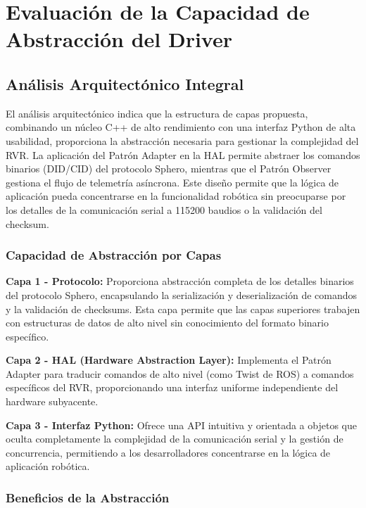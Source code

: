 \documentclass[11pt]{article}
\numberwithin{figure}{section}
\numberwithin{table}{section}
\begin{document}
\newpage


\section{Evaluación de la Capacidad de Abstracción del Driver}
\label{sec:evaluacion_abstraccion}


\subsection{Análisis Arquitectónico Integral}

El análisis arquitectónico indica que la estructura de capas propuesta, combinando un núcleo C++ de alto rendimiento con una interfaz Python de alta usabilidad, proporciona la abstracción necesaria para gestionar la complejidad del RVR. La aplicación del Patrón Adapter en la HAL permite abstraer los comandos binarios (DID/CID) del protocolo Sphero, mientras que el Patrón Observer gestiona el flujo de telemetría asíncrona. Este diseño permite que la lógica de aplicación pueda concentrarse en la funcionalidad robótica sin preocuparse por los detalles de la comunicación serial a 115200 baudios o la validación del checksum.


\subsubsection{Capacidad de Abstracción por Capas}

\textbf{Capa 1 - Protocolo:} Proporciona abstracción completa de los detalles binarios del protocolo Sphero, encapsulando la serialización y deserialización de comandos y la validación de checksums. Esta capa permite que las capas superiores trabajen con estructuras de datos de alto nivel sin conocimiento del formato binario específico.

\textbf{Capa 2 - HAL (Hardware Abstraction Layer):} Implementa el Patrón Adapter para traducir comandos de alto nivel (como Twist de ROS) a comandos específicos del RVR, proporcionando una interfaz uniforme independiente del hardware subyacente.

\textbf{Capa 3 - Interfaz Python:} Ofrece una API intuitiva y orientada a objetos que oculta completamente la complejidad de la comunicación serial y la gestión de concurrencia, permitiendo a los desarrolladores concentrarse en la lógica de aplicación robótica.


\subsubsection{Beneficios de la Abstracción}
\end{document}
